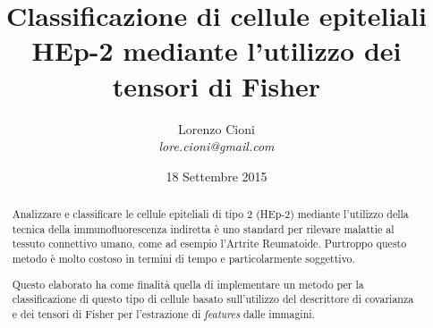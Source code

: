 \documentclass[a4paper,12pt]{article}
\title{\bf Classificazione di cellule epiteliali HEp-2 mediante l'utilizzo dei tensori di Fisher}
\date {18 Settembre 2015}
\author{Lorenzo Cioni\\\textit{{\small lore.cioni@gmail.com}}}
\begin{document}
\maketitle

\begin{abstract}

Analizzare e classificare le cellule epiteliali di tipo 2 (HEp-2) mediante l'utilizzo della tecnica della immunofluorescenza indiretta è uno standard per rilevare malattie al tessuto connettivo umano, come ad esempio l'Artrite Reumatoide. Purtroppo questo metodo è molto costoso in termini di tempo e particolarmente soggettivo.

Questo elaborato ha come finalità quella di implementare un metodo per la classificazione di questo tipo di cellule basato sull'utilizzo del descrittore di covarianza e dei tensori di Fisher per l'estrazione di \emph{features} dalle immagini.
\end{abstract}

\tableofcontents









\end{document}
